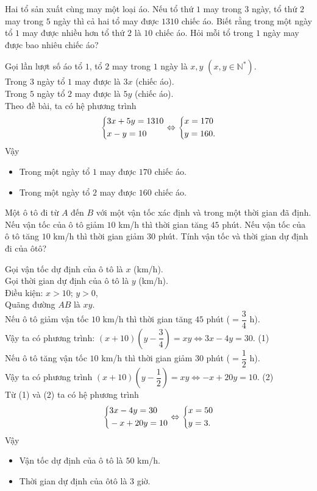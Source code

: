 \begin{bt}
	Hai tổ sản xuất cùng may một loại áo. Nếu tổ thứ $ 1 $ may trong $ 3 $ ngày, tổ thứ $ 2 $ may trong $ 5 $ ngày thì cả hai tổ may được $ 1310 $ chiếc áo. Biết rằng trong một ngày tổ $ 1 $ may được nhiều hơn tổ thứ $ 2 $ là $ 10 $ chiếc áo. Hỏi mỗi tổ trong $ 1 $ ngày may được bao nhiêu chiếc áo?	
	\loigiai
	{
		Gọi lần lượt số áo tổ $ 1 $, tổ $ 2 $ may trong $ 1 $ ngày là $ x,y $ $ (x, y \in \mathbb{N^*}) $.\\
		Trong $ 3 $ ngày tổ $ 1 $ may được là $ 3x $ (chiếc áo).\\
		Trong $ 5 $ ngày tổ $ 2 $ may được là $ 5y $ (chiếc áo).\\
		Theo đề bài, ta có hệ phương trình
		\[ \left\{\begin{aligned}&3x+5y=1310\\&x-y=10\end{aligned}\right. \Leftrightarrow \left\{\begin{aligned}&x=170\\&y=160.\end{aligned}\right.  \]
		Vậy
		\begin{itemize}
			\item Trong một ngày tổ $ 1 $ may được $ 170 $ chiếc áo.
			\item Trong một ngày tổ $ 2 $ may được $ 160 $ chiếc áo.
		\end{itemize}	
	}
\end{bt}




\begin{bt}
	Một ô tô đi từ $ A $ đến $ B $ với một vận tốc xác định và trong một thời gian đã định. Nếu vận tốc của ô tô giảm $ 10 $ km/h thì thời gian tăng $ 45 $ phút. Nếu vận tốc của ô tô tăng $ 10 $ km/h thì thời gian giảm $ 30 $ phút. Tính vận tốc và thời gian dự định đi của ôtô?	
	\loigiai
	{
		Gọi vận tốc dự định của ô tô là $ x $ (km/h).\\
		Gọi thời gian dự định của ô tô là $ y $ (km/h).\\
		Điều kiện: $ x>10$; $y>0 $,\\
		Quãng đường $ AB $ là $ xy $.\\                                                                        
		Nếu ô tô giảm vận tốc $ 10 $ km/h thì thời gian tăng $ 45 $ phút ($ =\dfrac{3}{4} $ h).\\
		Vậy ta có phương trình: $ (x + 10)(y - \dfrac{3}{4})=xy \Leftrightarrow 3x-4y=30$. \hfill (1)\\      
		Nếu ô tô tăng vận tốc $ 10 $ km/h thì thời gian giảm $ 30 $ phút ($ =\dfrac{1}{2} $ h).\\
		Vậy ta có phương trình   $ (x + 10)(y -\dfrac{1}{2} )=xy \Leftrightarrow -x + 20 y = 10 $. \hfill (2)\\    
		Từ (1) và (2) ta có hệ phương trình
		\[\left\{\begin{aligned}&3x-4y=30\\&-x+20y=10\end{aligned}\right. \Leftrightarrow \left\{\begin{aligned}&x=50\\&y=3.\end{aligned}\right. \]                       
		Vậy
		\begin{itemize}
			\item Vận tốc dự định của ô tô là $ 50 $ km/h.
			\item Thời gian dự định của ôtô là $ 3 $ giờ.
		\end{itemize}
	}
\end{bt}

